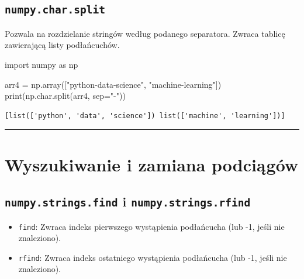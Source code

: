 \documentclass[
  polish,
  letterpaper,
  DIV=11,
  numbers=noendperiod]{scrreprt}
\newenvironment{Shaded}{\begin{snugshade}}{\end{snugshade}}
\newcommand{\BuiltInTok}[1]{\textcolor[rgb]{0.00,0.23,0.31}{#1}}
\newcommand{\ImportTok}[1]{\textcolor[rgb]{0.00,0.46,0.62}{#1}}
\newcommand{\NormalTok}[1]{\textcolor[rgb]{0.00,0.23,0.31}{#1}}
\newcommand{\OperatorTok}[1]{\textcolor[rgb]{0.37,0.37,0.37}{#1}}
\newcommand{\StringTok}[1]{\textcolor[rgb]{0.13,0.47,0.30}{#1}}
\providecommand{\tightlist}{%
  \setlength{\itemsep}{0pt}\setlength{\parskip}{0pt}}
\begin{document}
\subsection{\texorpdfstring{\texttt{numpy.char.split}}{numpy.char.split}}\label{numpy.char.split}

Pozwala na rozdzielanie stringów według podanego separatora. Zwraca
tablicę zawierającą listy podłańcuchów.

\begin{Shaded}
\begin{Highlighting}[]
\ImportTok{import}\NormalTok{ numpy }\ImportTok{as}\NormalTok{ np}

\NormalTok{arr4 }\OperatorTok{=}\NormalTok{ np.array([}\StringTok{"python{-}data{-}science"}\NormalTok{, }\StringTok{"machine{-}learning"}\NormalTok{])}
\BuiltInTok{print}\NormalTok{(np.char.split(arr4, sep}\OperatorTok{=}\StringTok{"{-}"}\NormalTok{))}
\end{Highlighting}
\end{Shaded}

\begin{verbatim}
[list(['python', 'data', 'science']) list(['machine', 'learning'])]
\end{verbatim}

\begin{center}\rule{0.5\linewidth}{0.5pt}\end{center}

\section{Wyszukiwanie i zamiana
podciągów}\label{wyszukiwanie-i-zamiana-podciux105guxf3w}

\subsection{\texorpdfstring{\texttt{numpy.strings.find} i
\texttt{numpy.strings.rfind}}{numpy.strings.find i numpy.strings.rfind}}\label{numpy.strings.find-i-numpy.strings.rfind}

\begin{itemize}
\tightlist
\item
  \texttt{find}: Zwraca indeks pierwszego wystąpienia podłańcucha (lub
  -1, jeśli nie znaleziono).
\item
  \texttt{rfind}: Zwraca indeks ostatniego wystąpienia podłańcucha (lub
  -1, jeśli nie znaleziono).
\end{itemize}
\end{document}
